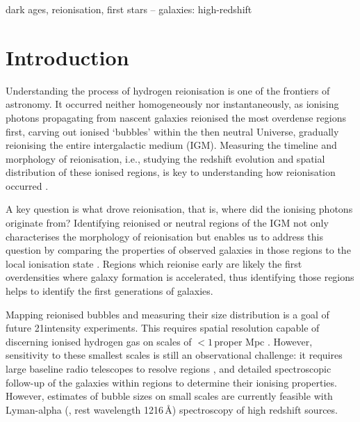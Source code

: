 \documentclass[fleqn,usenatbib]{mnras}
\begin{document}
\begin{keywords}
dark ages, reionisation, first stars -- galaxies: high-redshift
\end{keywords}



\section{Introduction}
\label{sec:intro}

Understanding the process of hydrogen reionisation is one of the frontiers of astronomy. 
It occurred neither homogeneously nor instantaneously, as ionising photons propagating from nascent galaxies reionised the most overdense regions first, carving out ionised `bubbles' within the then neutral Universe, gradually reionising the entire intergalactic medium (IGM). Measuring the timeline and morphology of reionisation, i.e., studying the redshift evolution and spatial distribution of these ionised regions, is key to understanding how reionisation occurred \citep[e.g.,][]{Furlanetto2004a,McQuinn2007,Mesinger2016a}.

A key question is what drove reionisation, that is, where did the ionising photons originate from?
Identifying reionised or neutral regions of the IGM not only characterises the morphology of reionisation but enables us to address this question by comparing the properties of observed galaxies in those regions to the local ionisation state \citep[e.g.,][]{Beardsley2015a}. Regions which reionise early are likely the first overdensities where galaxy formation is accelerated, thus identifying those regions helps to identify the first generations of galaxies.

Mapping reionised bubbles and measuring their size distribution is a goal of future 21\cm intensity experiments. This requires spatial resolution capable of discerning ionised hydrogen gas on scales of $<1$\,proper Mpc \citep[e.g.,][]{Geil2017}. However, sensitivity to these smallest scales is still an observational challenge: it requires large baseline radio telescopes to resolve \HI regions \citep[e.g., SKA-low,][]{Koopmans2015}, and detailed spectroscopic follow-up of the galaxies within \HII regions to determine their ionising properties. However, estimates of bubble sizes on small scales are currently feasible with Lyman-alpha (\lya, rest wavelength 1216\,\AA) spectroscopy of high redshift sources.
\end{document}
